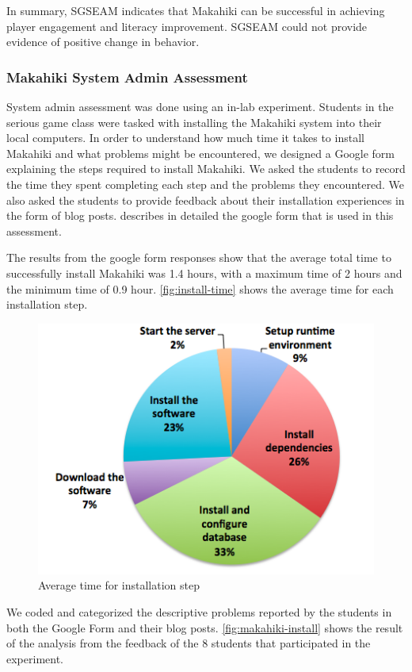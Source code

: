 \documentclass{sigchi}
\begin{document}
In summary, SGSEAM indicates that Makahiki can be successful in achieving
player engagement and literacy improvement. SGSEAM could not provide evidence of positive change in
behavior.

\subsubsection{Makahiki System Admin Assessment}

System admin assessment was done using an in-lab experiment.  Students in
the serious game class were tasked with installing the Makahiki system into their local
computers. In order to understand how much time it takes to install Makahiki and what
problems might be encountered, we designed a Google form explaining the steps required to
install Makahiki. We asked the students to record the time they spent completing each step
and the problems they encountered. We also asked the students to provide feedback about
their installation experiences in the form of blog posts. \cite{csdl2-13-04} describes in detailed
the google form that is used in this assessment.

The results from the google form responses show that the average total time to successfully install
Makahiki was 1.4 hours, with a maximum time of 2 hours and the minimum time of 0.9 hour.
\autoref{fig:install-time} shows the average time for each installation step.

\begin{figure}[ht!]
  \center
  \includegraphics[width=0.8\columnwidth]{install-time}
  \caption{Average time for installation step}
  \label{fig:install-time}
\end{figure}

We coded and categorized the descriptive problems reported by the students in both the Google Form
and their blog posts. \autoref{fig:makahiki-install} shows the result of the analysis from
the feedback of the 8 students that participated in the experiment.
\end{document}
